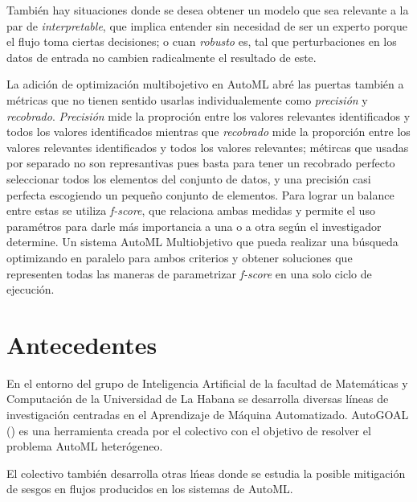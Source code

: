Tambi\'en hay situaciones donde se desea obtener un modelo que sea relevante a la par de \textit{interpretable}, que implica entender sin necesidad de ser un experto porque el flujo toma ciertas decisiones; o cuan \textit{robusto} es, tal que perturbaciones en los datos de entrada no cambien radicalmente el resultado de este.

La adici\'on de optimizaci\'on multibojetivo en AutoML abr\'e las puertas tambi\'en a m\'etricas que no tienen sentido usarlas individualemente como \textit{precisi\'on} y \textit{recobrado}. 
 \textit{Precisi\'on} mide la proproci\'on entre los valores relevantes identificados y todos los valores identificados
 mientras que \textit{recobrado} mide la proporci\'on entre los valores relevantes identificados y todos los valores relevantes;
 m\'etircas que usadas por separado no son represantivas pues basta para tener un recobrado perfecto seleccionar todos los elementos del conjunto de datos, y una precisi\'on casi perfecta escogiendo un pequeño conjunto de elementos.
 Para lograr un balance entre estas se utiliza \textit{f-score}, que relaciona ambas medidas y permite el uso  param\'etros para darle m\'as importancia a una o a otra seg\'un el investigador determine.  Un sistema AutoML Multiobjetivo que pueda realizar una b\'usqueda optimizando en paralelo para ambos criterios y obtener soluciones que representen todas las maneras de parametrizar \textit{f-score} en una solo ciclo de ejecuci\'on.


\section*{Antecedentes}

En el entorno del grupo de Inteligencia Artificial de la facultad de Matem\'aticas y Computaci\'on de la Universidad de La Habana se desarrolla diversas l\'ineas de investigaci\'on centradas en el Aprendizaje de M\'aquina Automatizado. AutoGOAL (\cite{estevez2020solving}) es una herramienta creada por el colectivo con el objetivo de resolver el problema AutoML heter\'ogeneo. 

El colectivo tambi\'en desarrolla otras l\'neas donde se estudia la posible mitigaci\'on de sesgos en flujos producidos en los sistemas de AutoML.

